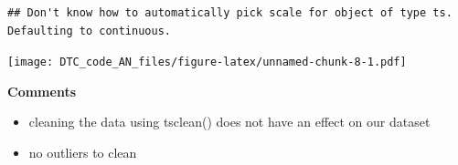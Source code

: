 \documentclass[
]{article}
\newenvironment{Shaded}{\begin{snugshade}}{\end{snugshade}}
\newcommand{\AttributeTok}[1]{\textcolor[rgb]{0.77,0.63,0.00}{#1}}
\newcommand{\CommentTok}[1]{\textcolor[rgb]{0.56,0.35,0.01}{\textit{#1}}}
\newcommand{\FunctionTok}[1]{\textcolor[rgb]{0.00,0.00,0.00}{#1}}
\newcommand{\NormalTok}[1]{#1}
\newcommand{\OtherTok}[1]{\textcolor[rgb]{0.56,0.35,0.01}{#1}}
\newcommand{\SpecialCharTok}[1]{\textcolor[rgb]{0.00,0.00,0.00}{#1}}
\newcommand{\StringTok}[1]{\textcolor[rgb]{0.31,0.60,0.02}{#1}}
\providecommand{\tightlist}{%
  \setlength{\itemsep}{0pt}\setlength{\parskip}{0pt}}
\begin{document}
\begin{Shaded}
\end{Shaded}

\begin{verbatim}
## Don't know how to automatically pick scale for object of type ts. Defaulting to continuous.
\end{verbatim}

\texttt{[image: DTC\_code\_AN\_files/figure-latex/unnamed-chunk-8-1.pdf]}

\textbf{Comments}

\begin{itemize}
\tightlist
\item
  cleaning the data using tsclean() does not have an effect on our
  dataset
\item
  no outliers to clean
\end{itemize}
\end{document}
